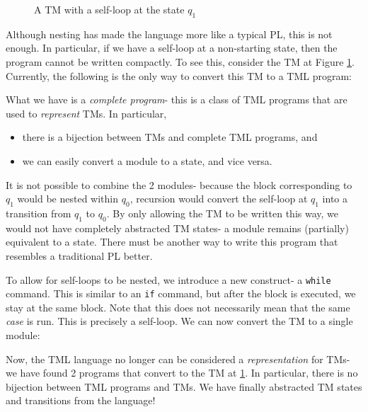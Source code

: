 \begin{figure}[htb]
    \centering
    \caption{A TM with a self-loop at the state $q_1$}
    \label{fig:self-loop-TM}
\end{figure}
Although nesting has made the language more like a typical PL, this is not enough. In particular, if we have a self-loop at a non-starting state, then the program cannot be written compactly. To see this, consider the TM at Figure \ref{fig:self-loop-TM}. Currently, the following is the only way to convert this TM to a TML program:

What we have is a \emph{complete program}- this is a class of TML programs that are used to \textit{represent} TMs. In particular, 
\begin{itemize}
    \item there is a bijection between TMs and complete TML programs, and
    \item we can easily convert a module to a state, and vice versa.
\end{itemize}
It is not possible to combine the 2 modules- because the block corresponding to $q_1$ would be nested within $q_0$, recursion would convert the self-loop at $q_1$ into a transition from $q_1$ to $q_0$. By only allowing the TM to be written this way, we would not have completely abstracted TM states- a module remains (partially) equivalent to a state. There must be another way to write this program that resembles a traditional PL better.

To allow for self-loops to be nested, we introduce a new construct- a \texttt{while} command. This is similar to an \texttt{if} command, but after the block is executed, we stay at the same block. Note that this does not necessarily mean that the same \textit{case} is run. This is precisely a self-loop. We can now convert the TM to a single module:

Now, the TML language no longer can be considered a \textit{representation} for TMs- we have found 2 programs that convert to the TM at \ref{fig:self-loop-TM}. In particular, there is no bijection between TML programs and TMs. We have finally abstracted TM states and transitions from the language!

